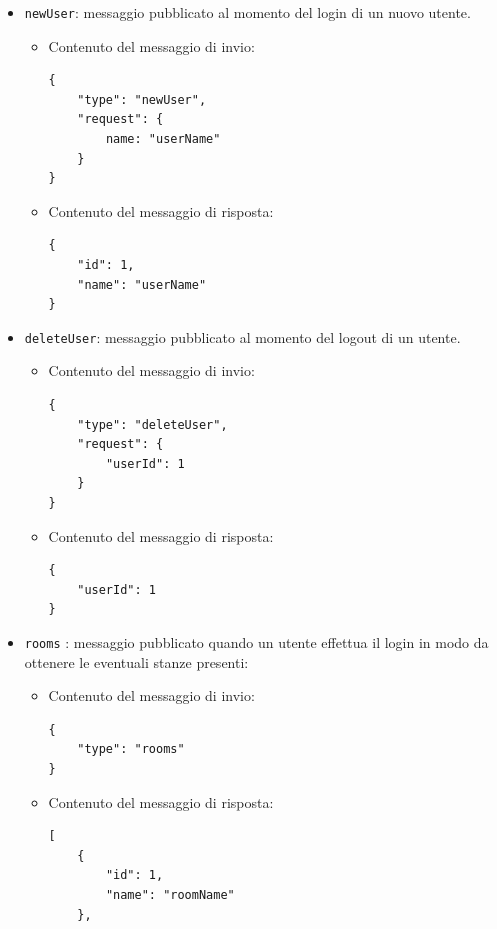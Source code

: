 \documentclass[a4paper]{article}
\begin{document}
\begin{itemize}

    \item \texttt{newUser}: messaggio pubblicato al momento del login di un nuovo utente.
        \begin{itemize}
            \item Contenuto del messaggio di invio:
            \begin{verbatim}
{
    "type": "newUser",
    "request": {
        name: "userName"
    } 
}
            \end{verbatim}

            \item Contenuto del messaggio di risposta:
            \begin{verbatim}
{
    "id": 1,
    "name": "userName"
}
	        \end{verbatim}         
        \end{itemize}

    \item \texttt{deleteUser}: messaggio pubblicato al momento del logout di un utente.
        \begin{itemize}
            \item Contenuto del messaggio di invio:
            \begin{verbatim}
{
    "type": "deleteUser",
    "request": {
        "userId": 1 
    } 
}
            \end{verbatim}
            \item Contenuto del messaggio di risposta:
            \begin{verbatim}
{
    "userId": 1
}
            \end{verbatim}
        \end{itemize}

    \item \texttt{rooms} : messaggio pubblicato quando un utente effettua il login in modo da ottenere le eventuali stanze presenti:
        \begin{itemize}
            \item Contenuto del messaggio di invio:
            \begin{verbatim}
{
    "type": "rooms"
}
            \end{verbatim}
            \item Contenuto del messaggio di risposta:
            \begin{verbatim}
[
    {
        "id": 1,
        "name": "roomName"
    },
    

\end{verbatim}
\end{itemize}
\end{itemize}
\end{document}

